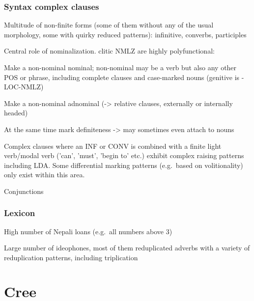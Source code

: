 \documentclass[a4paper, 11pt]{book}
\begin{document}
\subsubsection*{Syntax complex clauses}

\begin{itemize*}
\item Multitude of non-finite forms (some of them without any of the usual morphology, some with quirky reduced patterns): infinitive, converbs, participles
\item Central role of nominalization. clitic NMLZ are highly polyfunctional:
        \begin{itemize*}
	\item Make a non-nominal nominal; non-nominal may be a verb but also any other POS or phrase, including complete clauses and case-marked nouns (genitive is -LOC-NMLZ)
	\item Make a non-nominal adnominal (-> relative clauses, externally or internally headed)
	\item At the same time mark definiteness -> may sometimes even attach to nouns
        \end{itemize*}
\item Complex clauses where an INF or CONV is combined with a finite light verb/modal verb ('can', 'must', 'begin to' etc.) exhibit complex raising patterns including LDA. Some differential marking patterns (e.g.\ based on volitionality) only exist within this area.
\item Conjunctions
\end{itemize*}

\subsubsection*{Lexicon}

\begin{itemize*}
\item High number of Nepali loans (e.g.\ all numbers above 3)
\item Large number of ideophones, most of them reduplicated adverbs with a variety of reduplication patterns, including triplication
\end{itemize*}



\section{Cree}
\label{sec:Cree}
\end{document}
